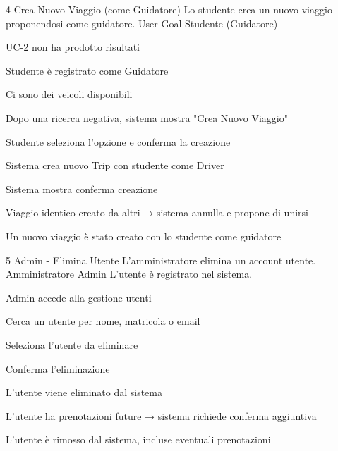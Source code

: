 \UseCase
{4}
{Crea Nuovo Viaggio (come Guidatore)}
{Lo studente crea un nuovo viaggio proponendosi come guidatore.}
{User Goal}
{Studente (Guidatore)}
{\begin{description}[nosep]
    \item[-] UC-2 non ha prodotto risultati
    \item[-] Studente è registrato come Guidatore
    \item[-] Ci sono dei veicoli disponibili
\end{description}}
{\begin{description}[nosep]
    \item[1.] Dopo una ricerca negativa, sistema mostra "Crea Nuovo Viaggio"
    \item[2.] Studente seleziona l'opzione e conferma la creazione
    \item[3.] Sistema crea nuovo Trip con studente come Driver
    \item[4.] Sistema mostra conferma creazione
\end{description}}
{\begin{description}[nosep]
    \item[3a.] Viaggio identico creato da altri → sistema annulla e propone di unirsi
\end{description}}
{Un nuovo viaggio è stato creato con lo studente come guidatore}

\UseCase
{5}
{Admin - Elimina Utente}
{L’amministratore elimina un account utente.}
{Amministratore}
{Admin}
{L’utente è registrato nel sistema.}
{\begin{description}[nosep]
    \item[1.] Admin accede alla gestione utenti
    \item[2.] Cerca un utente per nome, matricola o email
    \item[3.] Seleziona l’utente da eliminare
    \item[4.] Conferma l’eliminazione
    \item[5.] L'utente viene eliminato dal sistema
\end{description}}
{\begin{description}[nosep]
    \item[3a.] L’utente ha prenotazioni future → sistema richiede conferma aggiuntiva
\end{description}}
{L’utente è rimosso dal sistema, incluse eventuali prenotazioni}

